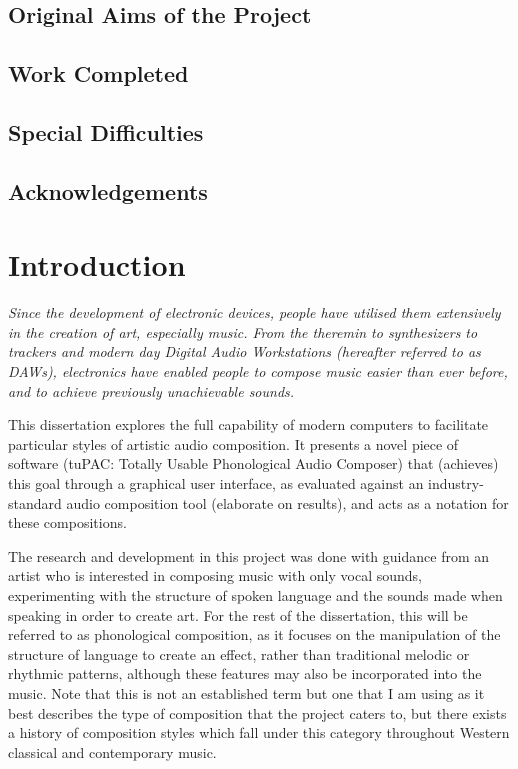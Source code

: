 \documentclass[12pt,a4paper,twoside,openright]{report}
\begin{document}
\section*{Original Aims of the Project}




\section*{Work Completed}


\section*{Special Difficulties}


\newpage

\tableofcontents

\listoffigures

\newpage
\section*{Acknowledgements}



\pagestyle{headings}

\chapter{Introduction}
\textit{
Since the development of electronic devices, people have utilised them extensively in the creation of art, especially music. From the theremin to synthesizers to trackers and modern day Digital Audio Workstations (hereafter referred to as DAWs), electronics have enabled people to compose music easier than ever before, and to achieve previously unachievable sounds.
}

This dissertation explores the full capability of modern computers to facilitate particular styles of artistic audio composition. It presents a novel piece of software (tuPAC: Totally Usable Phonological Audio Composer) that (achieves) this goal through a graphical user interface, as evaluated against an industry-standard audio composition tool (elaborate on results), and acts as a notation for these compositions.
 
 The research and development in this project was done with guidance from an artist who is interested in composing music with only vocal sounds, experimenting with the structure of spoken language and the sounds made when speaking in order to create art. For the rest of the dissertation, this will be referred to as phonological composition, as it focuses on the manipulation of the structure of language to create an effect, rather than traditional melodic or rhythmic patterns, although these features may also be incorporated into the music. Note that this is not an established term but one that I am using as it best describes the type of composition that the project caters to, but there exists a history of composition styles which fall under this category throughout Western classical and contemporary music.
\end{document}
